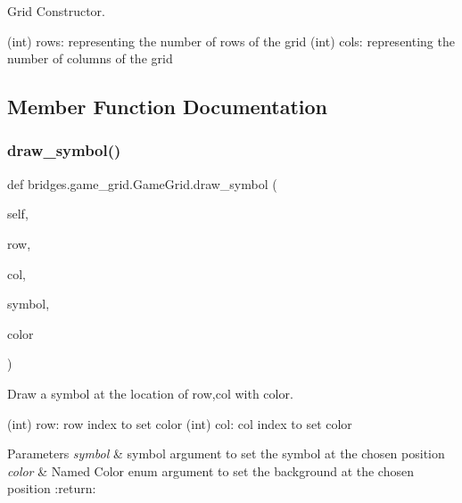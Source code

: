 Grid Constructor. 

\begin{DoxyVerb}       (int) rows: representing the number of rows of the grid
       (int) cols: representing the number of columns of the grid
\end{DoxyVerb}
 

\subsection{Member Function Documentation}
\mbox{\label{classbridges_1_1game__grid_1_1_game_grid_aa7ce48d090d75c8022a8356aafad303f}} 
\subsubsection{\texorpdfstring{draw\_symbol()}{draw\_symbol()}}
{\footnotesize\ttfamily def bridges.\+game\+\_\+grid.\+Game\+Grid.\+draw\+\_\+symbol (\begin{DoxyParamCaption}\item[{}]{self,  }\item[{}]{row,  }\item[{}]{col,  }\item[{}]{symbol,  }\item[{}]{color }\end{DoxyParamCaption})}



Draw a symbol at the location of row,col with color. 

\begin{DoxyVerb}       (int) row: row index to set color
       (int) col: col index to set color
\end{DoxyVerb}
 
\begin{DoxyParams}{Parameters}
{\em symbol} & symbol argument to set the symbol at the chosen position \\
\hline
{\em color} & Named Color enum argument to set the background at the chosen position \+:return\+: \\
\hline
\end{DoxyParams}
\mbox{\label{classbridges_1_1game__grid_1_1_game_grid_a832152905603c62aae8c23264b1ab030}} 
